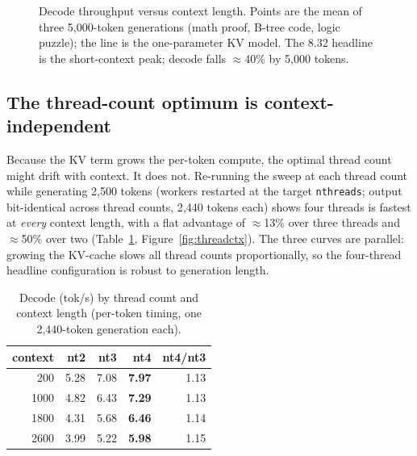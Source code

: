 \documentclass[10pt,a4paper]{article}
\begin{document}
\begin{figure}[H]
\centering
{}
\caption{Decode throughput versus context length. Points are the mean of three 5{,}000-token generations (math proof, B-tree code, logic puzzle); the line is the one-parameter KV model. The 8.32 headline is the short-context peak; decode falls $\approx$40\% by 5{,}000 tokens.}
\label{fig:context}
\end{figure}

\subsection{The thread-count optimum is context-independent}
\label{sec:threadcontext}
Because the KV term grows the per-token compute, the optimal thread count might drift with context. It does not. Re-running the sweep at each thread count while generating 2{,}500 tokens (workers restarted at the target \texttt{nthreads}; output bit-identical across thread counts, 2{,}440 tokens each) shows four threads is fastest at \emph{every} context length, with a flat advantage of $\approx$13\% over three threads and $\approx$50\% over two (Table~\ref{tab:threadctx}, Figure~\ref{fig:threadctx}). The three curves are parallel: growing the KV-cache slows all thread counts proportionally, so the four-thread headline configuration is robust to generation length.

\begin{table}[H]
\centering\small
\caption{Decode (tok/s) by thread count and context length (per-token timing, one 2{,}440-token generation each).}
\label{tab:threadctx}
\begin{tabular}{@{}rrrrr@{}}
\toprule
\textbf{context} & \textbf{nt2} & \textbf{nt3} & \textbf{nt4} & \textbf{nt4/nt3} \\
\midrule
200  & 5.28 & 7.08 & \textbf{7.97} & 1.13 \\
1000 & 4.82 & 6.43 & \textbf{7.29} & 1.13 \\
1800 & 4.31 & 5.68 & \textbf{6.46} & 1.14 \\
2600 & 3.99 & 5.22 & \textbf{5.98} & 1.15 \\
\bottomrule
\end{tabular}
\end{table}
\end{document}
